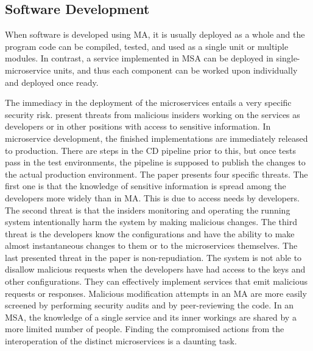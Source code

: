 \subsection{Software Development}
\begin{sloppypar}
    When software is developed using MA, it is usually deployed as a whole and
    the program code can be compiled, tested, and used as a single unit or
    multiple modules. In contrast, a service implemented in MSA can be deployed
    in single-microservice units, and thus each component can be worked upon
    individually and deployed once ready. 
\end{sloppypar}
\begin{sloppypar}
    The immediacy in the deployment of the microservices entails a very specific
    security risk. \citet{integinside} present threats from malicious insiders
    working on the services as developers or in other positions with access to
    sensitive information. In microservice development, the finished
    implementations are immediately released to production. There are steps in
    the CD pipeline prior to this, but once tests pass in the test environments,
    the pipeline is supposed to publish the changes to the actual production
    environment. The paper presents four specific threats. The first one is that
    the knowledge of sensitive information is spread among the developers more
    widely than in MA. This is due to access needs by developers. The second
    threat is that the insiders monitoring and operating the running system
    intentionally harm the system by making malicious changes. The third threat
    is the developers know the configurations and have the ability to make
    almost instantaneous changes to them or to the microservices themselves. The
    last presented threat in the paper is non-repudiation. The system is not
    able to disallow malicious requests when the developers have had access to
    the keys and other configurations. They can effectively implement services
    that emit malicious requests or responses. Malicious modification attempts
    in an MA are more easily screened by performing security audits and by
    peer-reviewing the code. In an MSA, the knowledge of a single service and
    its inner workings are shared by a more limited number of people. Finding
    the compromised actions from the interoperation of the distinct
    microservices is a daunting task.
\end{sloppypar}

